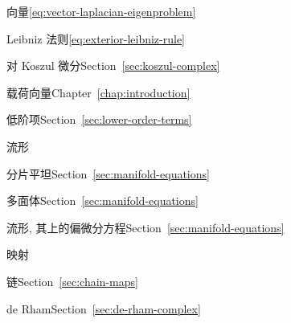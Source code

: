 \begin{theindex}
\subitem {}\label{index:laplacian-vector}{向量}\quad \eqref{eq:vector-laplacian-eigenproblem}

\item {}\label{index:leibniz-rule}{Leibniz 法则}\quad \eqref{eq:exterior-leibniz-rule}

\subitem {}\label{index:leibniz-rule-for-koszul-differential}{对 Koszul 微分}\quad Section~\ref{sec:koszul-complex}

\item {}\label{index:load-vector}{载荷向量}\quad Chapter~\ref{chap:introduction}

\item {}\label{index:lower-order-terms}{低阶项}\quad Section~\ref{sec:lower-order-terms}

\item {}\label{index:manifold}{流形}

\subitem {}\label{index:manifold-piecewise-flat}{分片平坦}\quad Section~\ref{sec:manifold-equations}

\subitem {}\label{index:manifold-polyhedral}{多面体}\quad Section~\ref{sec:manifold-equations}

\item {}\label{index:manifolds-pdes-on}{流形, 其上的偏微分方程}\quad Section~\ref{sec:manifold-equations}

\item {}\label{index:map}{映射}

\subitem {}\label{index:map-chain}{链}\quad Section~\ref{sec:chain-maps}

\subitem {}\label{index:map-de-rham}{de Rham}\quad Section~\ref{sec:de-rham-complex}


\end{theindex}
